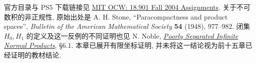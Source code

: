 官方目录与 PS5 下载链接见
\href{https://ocw.mit.edu/courses/18-901-introduction-to-topology-fall-2004/pages/assignments/}{MIT OCW: 18.901 Fall 2004 Assignments}.
关于不可数积的非正规性, 原始出处是 A. H. Stone, ``Paracompactness and product spaces'', \emph{Bulletin of the American Mathematical Society} \textbf{54} (1948), 977--982. 闭集 $H_0,H_1$ 的定义及这一反例的不同证明也见 N. Noble, \href{https://arxiv.org/abs/2002.02483}{\emph{Poorly Separated Infinite Normal Products}}, \S6.1. 本章已展开有限坐标证明, 并未将这一结论视为前十五章已经证明的教材结论.
